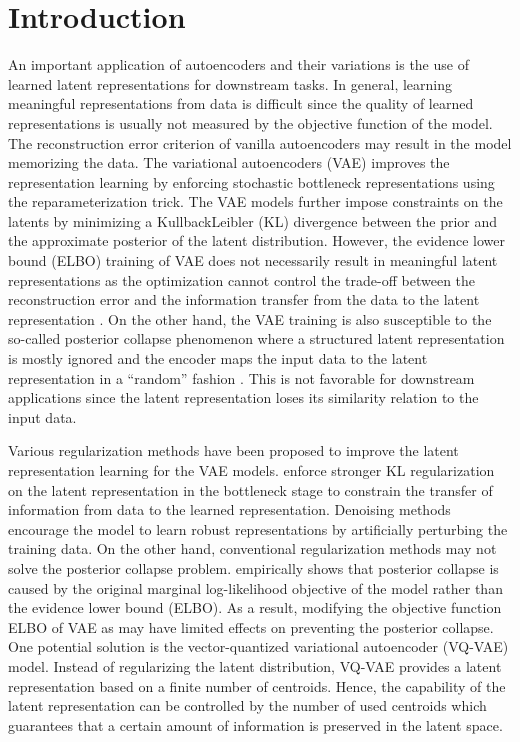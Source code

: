 \documentclass[letterpaper]{article} %
\begin{document}
\section{Introduction}
An important application of autoencoders and their variations is the use of learned latent representations for downstream tasks. In general, learning meaningful representations from data is difficult since the quality of learned representations is usually not measured by the objective function of the model. The reconstruction error criterion of vanilla autoencoders may result in the model memorizing the data. The variational autoencoders (VAE) \cite{kingma:14:iclr} improves the representation learning by enforcing stochastic bottleneck representations using the reparameterization trick. The VAE models further impose constraints on the latents by minimizing a KullbackLeibler (KL) divergence between the prior and the approximate posterior of the latent distribution. However, the evidence lower bound (ELBO) training of VAE does not necessarily result in meaningful latent representations as the optimization cannot control the trade-off between the reconstruction error and the information transfer from the data to the latent representation \cite{pmlr-v80-alemi18a}. On the other hand, the VAE training is also susceptible to the so-called posterior collapse phenomenon where a structured latent representation is mostly ignored and the encoder maps the input data to the latent representation in a ``random'' fashion \cite{Lucas2019}. This is not favorable for downstream applications since the latent representation loses its similarity relation to the input data.

 Various regularization methods have been proposed to improve the latent representation learning for the VAE models. \cite{Higgins:17:iclr}\cite{burgess2018understanding} enforce stronger KL regularization on the latent representation in the bottleneck stage to constrain the transfer of information from data to the learned representation. Denoising methods \cite{8253482}\cite{NIPS2018_7692}\cite{bengio:AAAI:17} encourage the model to learn robust representations by artificially perturbing the training data. On the other hand, conventional regularization methods may not solve the posterior collapse problem. \cite{Lucas2019} empirically shows that posterior collapse is caused by the original marginal log-likelihood objective of the model rather than the evidence lower bound (ELBO). As a result, modifying the objective function ELBO of VAE as \cite{Higgins:17:iclr}\cite{burgess2018understanding} may have limited effects on preventing the posterior collapse. One potential solution is the vector-quantized variational autoencoder (VQ-VAE) \cite{oord:17:nips} model. Instead of regularizing the latent distribution, VQ-VAE provides a latent representation based on a finite number of centroids. Hence, the capability of the latent representation can be controlled by the number of used centroids which guarantees that a certain amount of information is preserved in the latent space.
\end{document}

